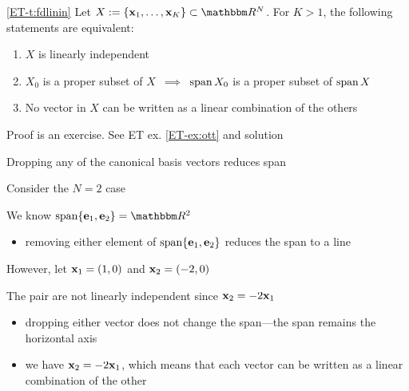 \begin{frame}

    \vspace{2em}
    \Thm\eqref{ET-t:fdlinin}
        Let $X := \{\boldx_1,\ldots, \boldx_K\} \subset \RR^N$.  For $K > 1$, the
        following statements are equivalent:
        \begin{enumerate}
            \item $X$ is linearly independent
            \item $X_0$ is a proper subset of $X$
                $\,\implies\,$ $\operatorname{span} X_0$ is a proper subset of $\operatorname{span} X$
            \item No vector in $X$ can be written as a linear combination of the others
        \end{enumerate}
    Proof is an exercise. See ET ex. \ref{ET-ex:ott} and solution
    
\end{frame}

\begin{frame}

    \vspace{2em}
    \Eg 
    Dropping any of the canonical basis vectors reduces span

    Consider the $N=2$ case
    
    We know $\Span \{\bolde_1, \bolde_2\} = \RR^2$
    
    \begin{itemize}
    \item removing either element of $\operatorname{span} \{{\mathbf e}_1, {\mathbf e}_2\}$ reduces the span to a line
    \end{itemize}
    
\end{frame}

\begin{frame}

    \vspace{2em}
    However, let ${\mathbf x}_1 = (1,0)$ and ${\mathbf x}_2 = (-2,0)$
    
    \vspace{1em}
    The pair are not linearly independent since ${\mathbf x}_2 = -2{\mathbf x}_1$
        \begin{itemize}
            \item dropping
                either vector does not change the span---the span remains the horizontal axis 
            \item we have ${\mathbf x}_2 = -2
            {\mathbf x}_1$, which means that each vector can be written as a linear combination
            of the other
        \end{itemize}
        
        \begin{center}
            
        \end{center}
 \end{frame}


